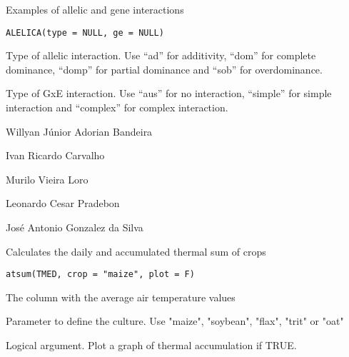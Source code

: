 \documentclass[a4paper]{book}
\begin{document}
%
\begin{Description}
Examples of allelic and gene interactions
\end{Description}
%
\begin{Usage}
\begin{verbatim}
ALELICA(type = NULL, ge = NULL)
\end{verbatim}
\end{Usage}
%
\begin{Arguments}
\begin{ldescription}
\item[\code{type}] Type of allelic interaction. Use “ad” for additivity, “dom”
for complete dominance, “domp” for partial dominance and “sob” for
overdominance.

\item[\code{ge}] Type of GxE interaction. Use “aus” for no interaction,
“simple” for simple interaction and “complex” for complex interaction.
\end{ldescription}
\end{Arguments}
%
\begin{Author}
Willyan Júnior Adorian Bandeira

Ivan Ricardo Carvalho

Murilo Vieira Loro

Leonardo Cesar Pradebon

José Antonio Gonzalez da Silva
\end{Author}
%
\begin{Description}
Calculates the daily and accumulated thermal sum of crops
\end{Description}
%
\begin{Usage}
\begin{verbatim}
atsum(TMED, crop = "maize", plot = F)
\end{verbatim}
\end{Usage}
%
\begin{Arguments}
\begin{ldescription}
\item[\code{TMED}] The column with the average air temperature values

\item[\code{crop}] Parameter to define the culture. Use "maize", "soybean", "flax",
"trit" or "oat"

\item[\code{plot}] Logical argument. Plot a graph of thermal accumulation if TRUE.
\end{ldescription}
\end{Arguments}
\end{document}
